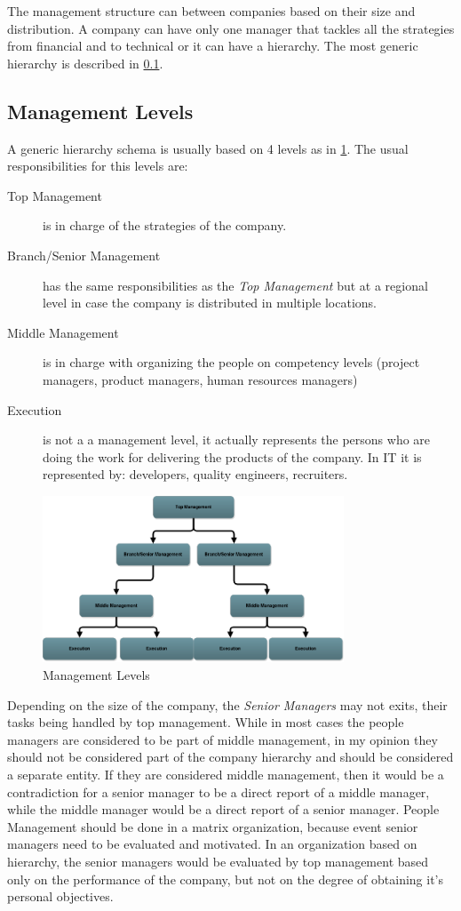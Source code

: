 The management structure can between companies based on their size and distribution. A company can have only one manager that tackles all the strategies from financial and to technical or it can have a hierarchy. 
The most generic hierarchy is described in \cref{subsec:levels}.
\subsection{Management Levels}
\label{subsec:levels}
A generic hierarchy schema is usually based on 4 levels as in \cref{fig:levels}. The usual responsibilities for this levels are:

\begin{description}
\item[Top Management] is in charge of the strategies of the company.
\item[Branch/Senior Management] has the same responsibilities as the \textit{Top Management} but at a regional level in case the company is distributed in multiple locations.
\item[Middle Management] is in charge with organizing the people on competency levels (project managers, product managers, human resources managers)
\item[Execution] is not a a management level, it actually represents the persons who are doing the work for delivering the products of the company. In IT it is represented by: developers, quality engineers, recruiters.
\end{description} 

\begin{figure}[h]
\centering
\includegraphics[width=0.8\textwidth]{img/levels.png}
\caption{Management Levels}
\label{fig:levels}
\end{figure}
Depending on the size of the company, the \textit{Senior Managers} may not exits, their tasks being handled by top management.
While in most cases the people managers are considered to be part of middle management, in my opinion they should not be considered part of the company hierarchy and should be considered a separate entity. If they are considered middle management, then it would be a contradiction for a senior manager to be a direct report of a middle manager, while the middle manager would be a direct report of a senior manager. People Management should be done in a matrix organization, because event senior managers need to be evaluated and motivated. In an organization based on hierarchy, the senior managers would be evaluated by top management based only on the performance of the company, but not on the degree of obtaining it's personal objectives.



